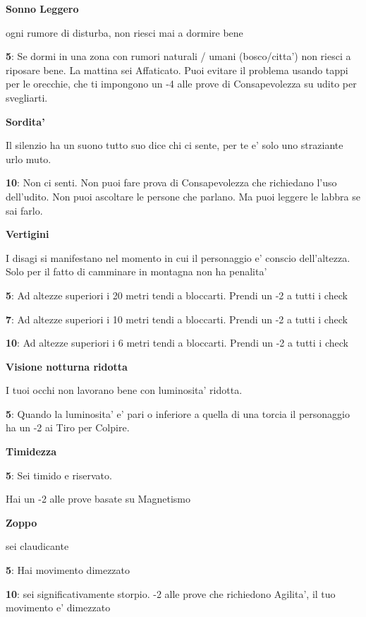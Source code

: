 \documentclass[a4paper,11pt,twoside,openany]{dndbook}
\begin{document}
{\textbf{Sonno Leggero}

ogni rumore di disturba, non riesci mai a dormire bene

\textbf{5}: Se dormi in una zona con rumori naturali / umani (bosco/citta') non riesci a riposare bene. La mattina sei Affaticato. Puoi evitare il problema usando tappi per le orecchie, che ti impongono un -4 alle prove di Consapevolezza su udito per svegliarti.

\textbf{Sordita'}

Il silenzio ha un suono tutto suo dice chi ci sente, per te e' solo uno straziante urlo muto.

\textbf{10}: Non ci senti. Non puoi fare prova di Consapevolezza che richiedano l'uso dell'udito. Non puoi ascoltare le persone che parlano. Ma puoi leggere le labbra se sai farlo.

\textbf{Vertigini}

I disagi si manifestano nel momento in cui il personaggio e' conscio dell'altezza. Solo per il fatto di camminare in montagna non ha penalita'

\textbf{5}: Ad altezze superiori i 20 metri tendi a bloccarti. Prendi un -2 a tutti i check

\textbf{7}: Ad altezze superiori i 10 metri tendi a bloccarti. Prendi un -2 a tutti i check

\textbf{10}: Ad altezze superiori i 6 metri tendi a bloccarti. Prendi un -2 a tutti i check

\textbf{Visione notturna ridotta}

I tuoi occhi non lavorano bene con luminosita' ridotta.

\textbf{5}: Quando la luminosita' e' pari o inferiore a quella di una torcia il personaggio ha un -2 ai Tiro per Colpire.

\textbf{Timidezza}

\textbf{5}: Sei timido e riservato.

Hai un -2 alle prove basate su Magnetismo

\textbf{Zoppo}

sei claudicante

\textbf{5}: Hai movimento dimezzato

\textbf{10}: sei significativamente storpio. -2 alle prove che richiedono Agilita', il tuo movimento e' dimezzato

\bigskip

}
\end{document}

